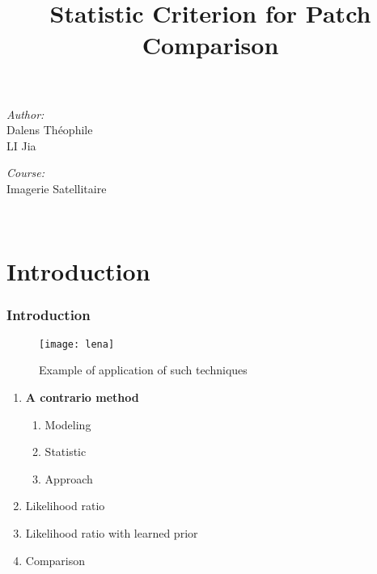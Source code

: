 \documentclass[compress]{beamer} %
\begin{document}
 \title{Statistic Criterion for Patch Comparison}  

 \begin{frame}
\titlepage
    \centering
    \begin{minipage}{0.4\textwidth}
    \begin{flushleft} \large
    \emph{Author:}\\
    Dalens Théophile\\
    LI Jia\\
    
    \end{flushleft}
    \end{minipage}
    \begin{minipage}{0.4\textwidth}
    \begin{flushright} \large
    \emph{Course:}\\
    Imagerie Satellitaire
    \end{flushright}
    \end{minipage}\\[3cm]
 \end{frame}
 \section{Introduction}
 \begin{frame}
  \frametitle{Introduction}
	\begin{figure}[h!]
	\centering
	\begin{minipage}{0.7\linewidth}
	\texttt{[image: lena]}
	\end{minipage}
	    \caption{Example of application of such techniques}
	\end{figure}
 \end{frame}

 \begin{frame}
 \scriptsize
 {
 \begin{enumerate}


  \item \textbf{A contrario method}
  \begin{enumerate}
   \item Modeling
   \item Statistic
   \item Approach
   
  \end{enumerate}

  \item Likelihood ratio
  \item Likelihood ratio with learned prior
  \item Comparison
  
 \end{enumerate}

  
 }
 \end{frame} 
 
\end{document}
